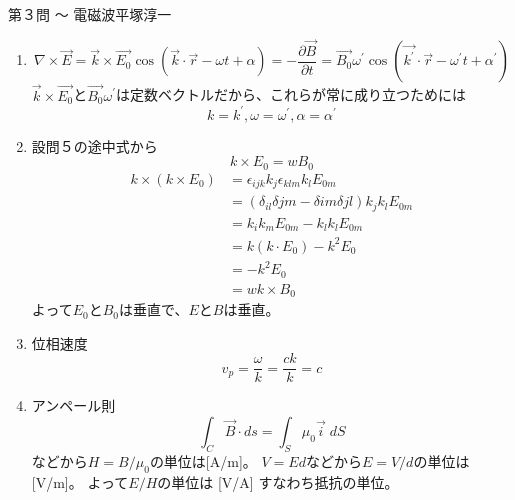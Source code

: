 \begin{answer}{第３問 〜 電磁波}{平塚淳一}
\begin{enumerate}
  \begin{equation}
  \nabla \cdot \overrightarrow{E} = \overrightarrow{E_0} \cdot \overrightarrow{k} \cos(k \cdot r -\omega t +\alpha)=0
  \end{equation}
  \begin{equation}
  \nabla \cdot \overrightarrow{B} = \overrightarrow{B_0} \cdot \overrightarrow{k} \cos(k \cdot r -\omega t +\alpha)=0
  \end{equation}
  これが常に成り立つので
  \begin{equation}
   \overrightarrow{E_0} \cdot \overrightarrow{k} = \overrightarrow{B_0} \cdot \overrightarrow{k^{\prime}}=0
  \end{equation}
  よって$E$と$k$、$B$と$k^{\prime}$は垂直。
\item 
  \begin{equation}
  \nabla \times \overrightarrow{E} = \overrightarrow{k} \times \overrightarrow{E_0} \cos(\overrightarrow{k} \cdot \overrightarrow{r} - \omega t +\alpha)
  =- \frac{\partial \overrightarrow{B}}{\partial t}
  =\overrightarrow{B_0} \omega^{\prime} \cos(\overrightarrow{k^{\prime}} \cdot \overrightarrow{r} -\omega^{\prime}t + \alpha^{\prime})
  \end{equation}
  $\overrightarrow{k} \times \overrightarrow{E_0}$と$\overrightarrow{B_0}  \omega^{\prime}$は定数ベクトルだから、これらが常に成り立つためには
  \begin{equation}
  k = k^{\prime}  ,\omega=\omega^{\prime}  ,\alpha=\alpha^{\prime}
  \end{equation}
\item 設問５の途中式から
  \begin{equation}
  k \times E_0 = wB_0
  \end{equation}
  \begin{align}
  k \times (k \times E_0)&= \epsilon_{ijk}k_j\epsilon_{klm}k_lE_{0m}\\
  &=(\delta_{il}\delta{jm}-\delta{im}\delta{jl})k_jk_lE_{0m}\\
  &=k_ik_mE_{0m}-k_lk_lE_{0m}\\
  &=k(k \cdot E_0)-k^2E_0\\
  &=-k^2E_0\\
  &=wk \times B_0
  \end{align}
  よって$E_0$と$B_0$は垂直で、$E$と$B$は垂直。
\item 
  位相速度
  \begin{equation}
  v_p=\frac{\omega}{k}=\frac{ck}{k}=c
  \end{equation}
\item 
  アンペール則
  \begin{equation}
  \int_C \overrightarrow{B} \cdot ds = \int_S \mu_0 \overrightarrow{i} \;dS
  \end{equation}
  などから$H=B/ \mu_0$の単位は[A/m]。
  $V=Ed$などから$E=V/d$の単位は[V/m]。
  よって$E/H$の単位は [V/A] すなわち抵抗の単位。
\end{enumerate}
\end{answer}
